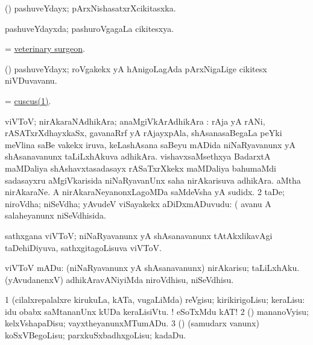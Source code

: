 \bentry
{} 
\gl{\nA}
\expl{}
\bmng
 (\ame) pashuveYdayx; pArxNishasatxrXcikitasxka. 
\emng
\eentry

\bentry
{} 
\gl{\gu}
\expl{}
\bmng
 pashuveYdayxda; pashuroVgagaLa cikitesxya. 
\emng
\eentry

\bentry
{} 
\gl{\nA}
\bmng
 = \hyperlink{veterinary surgeon}{veterinary surgeon}. 
\emng
\eentry

\bentry
{}
\gl{\nA}
\expl{}
\bmng
 (\birx) pashuveYdayx; roVgakekx yA hAnigoLagAda pArxNigaLige cikitesx niVDuvavanu. 
\emng
\eentry

\bentry
{} 
\gl{\nA}
\bmng
 = \hyperref{kandict_c.pdf}{C}{cuscus(1)}{cuscus(1)}. 
\emng
\eentry

\bentry
{} 
\gl{\nA}
\bmng
\bnum
{} viVToV; nirAkaraNAdhikAra; anaMgiVkArAdhikAra : 
\banum
{} rAja yA rANi, rASATxrXdhayxkaSx, gavanaRrf yA rAjayxpAla, shAsanasaBegaLa peYki meVlina saBe \mo vakekx iruva, keLashAsana saBeyu mADida niNaRyavanunx yA shAsanavanunx taLiLxhAkuva adhikAra. 
 vishavxsaMsethxya BadarxtA maMDaliya shAshavxtasadasayx rASaTxrXkekx maMDaliya bahumaMdi sadasayxru aMgiVkarisida niNaRyavanUnx saha nirAkarisuva adhikAra. 
 aMtha nirAkaraNe. 
 A nirAkaraNeyanonxLagoMDa saMdeVsha yA sudidx. 
\eanum
\numie
\num{2} taDe; niroVdha; niSeVdha; yAvudeV viSayakekx aDiDxmADuvudu:  (  avanu A salaheyanunx niSeVdhisida. 
\enum
\emng

\noindent 
\gl{\pagu}
\expl{}
\bmng
  sathxgana viVToV; niNaRyavanunx yA shAsanavanunx tAtAkxlikavAgi taDehiDiyuva, sathxgitagoLisuva viVToV. 
\emng
\eentry

\bentry
{} 
\gl{\sakirx}
\bmng
 viVToV mADu: 
\banum
{} (niNaRyavanunx yA shAsanavanunx) nirAkarisu; taLiLxhAku. 
 (yAvudanenxV) adhikAravANiyiMda niroVdhisu, niSeVdhisu. 
\eanum
\emng
\eentry

\bentry
{} 
\gl{\sakirx}
\expl{}
\bmng
\bnum
\num{1} (cilalxrepalalxre kirukuLa, kATa, \mo vugaLiMda) reVgisu; kirikirigoLisu; keraLisu:  idu obabx saMtananUnx kUDa keraLisiVtu. ! eSoTxMdu kAT! 
\num{2} (\pArxparx) mananoVyisu; kelxVshapaDisu; vayxtheyanunxMTumADu. 
\num{3} (\pArxparx) (samudarx \mo vanunx) koSxVBegoLisu; parxkuSxbadhxgoLisu; kadaDu. 
\enum
\emng
\eentry

